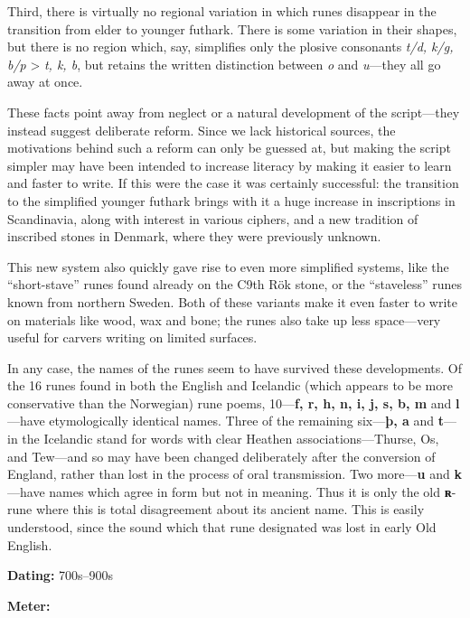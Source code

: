 Third, there is virtually no regional variation in which runes disappear in the transition from elder to younger futhark.  There is some variation in their shapes, but there is no region which, say, simplifies only the plosive consonants \emph{t/d, k/g, b/p} > \emph{t, k, b}, but retains the written distinction between \emph{o} and \emph{u}—they all go away at once.

These facts point away from neglect or a natural development of the script—they instead suggest deliberate reform.  Since we lack historical sources, the motivations behind such a reform can only be guessed at, but making the script simpler may have been intended to increase literacy by making it easier to learn and faster to write.  If this were the case it was certainly successful: the transition to the simplified younger futhark brings with it a huge increase in inscriptions in Scandinavia, along with interest in various ciphers, and a new tradition of inscribed stones in Denmark, where they were previously unknown.

This new system also quickly gave rise to even more simplified systems, like the “short-stave” runes found already on the C9th Rök stone, or the “staveless” runes known from northern Sweden.  Both of these variants make it even faster to write on materials like wood, wax and bone; the runes also take up less space—very useful for carvers writing on limited surfaces.

In any case, the names of the runes seem to have survived these developments.  Of the 16 runes found in both the English and Icelandic (which appears to be more conservative than the Norwegian) rune poems, 10—\textbf{f, r, h, n, i, j, s, b, m} and \textbf{l}—have etymologically identical names.  Three of the remaining six—\textbf{þ, a} and \textbf{t}—in the Icelandic stand for words with clear Heathen associations—Thurse, Os, and Tew—and so may have been changed deliberately after the conversion of England, rather than lost in the process of oral transmission.  Two more—\textbf{u} and \textbf{k}—have names which agree in form but not in meaning.  Thus it is only the old \textbf{ʀ}-rune where this is total disagreement about its ancient name.  This is easily understood, since the sound which that rune designated was lost in early Old English.


\begin{flushright}%
\textbf{Dating:} 700s–900s%

\textbf{Meter:} \Fornyrdislag%
\end{flushright}%

